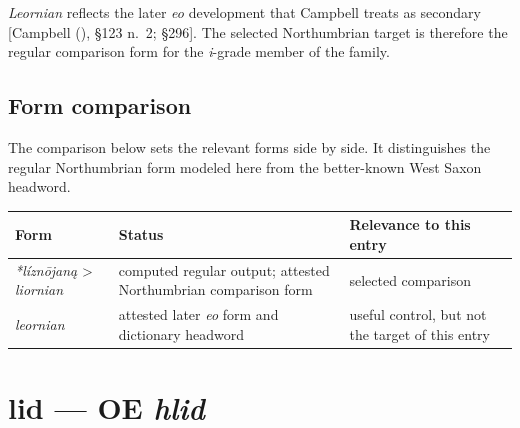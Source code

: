 \documentclass[
  british,
  a4paper,
  openany]{book}
\newcounter{none} %
\providecommand{\texorpdfstring}[2]{#1}
\begin{document}
\emph{Leornian} reflects the later \emph{eo} development that Campbell
treats as secondary {[}Campbell (),
§123 n.~2; §296{]}. The selected Northumbrian target is therefore the
regular comparison form for the \emph{i}-grade member of the family.

\subsection{Form comparison}\label{form-comparison-1}

The comparison below sets the relevant forms side by side. It
distinguishes the regular Northumbrian form modeled here from the
better-known West Saxon headword.

{\def\LTcaptype{none} %
\begin{longtable}[]{@{}
  >{\raggedright\arraybackslash}p{}
  >{\raggedright\arraybackslash}p{}
  >{\raggedright\arraybackslash}p{}@{}}
\toprule\noalign{}
\begin{minipage}[b]{\linewidth}\raggedright
Form
\end{minipage} & \begin{minipage}[b]{\linewidth}\raggedright
Status
\end{minipage} & \begin{minipage}[b]{\linewidth}\raggedright
Relevance to this entry
\end{minipage} \\
\midrule\noalign{}
\endhead
\bottomrule\noalign{}
\endlastfoot
\emph{*líznōjaną} \textgreater{} \emph{liornian} & computed regular
output; attested Northumbrian comparison form & selected comparison \\
\emph{leornian} & attested later \emph{eo} form and dictionary headword
& useful control, but not the target of this entry \\
\end{longtable}
}

\section{\texorpdfstring{lid --- OE
\emph{hlid}}{lid --- OE hlid}}\label{lid-oe-hlid}

\end{document}
